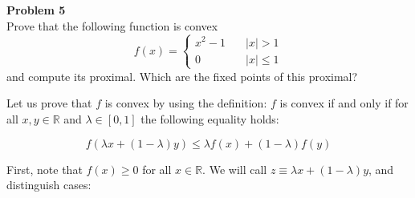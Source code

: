 \documentclass[11pt,table]{article}
\newcommand{\R}{\mathbb{R}}
\newenvironment{problem}[2][Problem]
{ \begin{mdframed}[backgroundcolor=gray!20] \textbf{#1 #2} \\ }
	{  \end{mdframed} }
\begin{document}
	\begin{problem}{5}
		Prove that the following function is convex
		\[
		f(x) =
		\begin{cases}
			x^{2}-1 \quad & |x|>1 \\
			0  \quad & |x| \leq 1
		\end{cases}
		\]
		and compute its proximal. Which are the fixed points of this proximal?
	\end{problem}
	
	Let us prove that $f$ is convex by using the definition: $f$ is convex if and only if for all $x,y \in \R$ and $\lambda \in [0,1]$ the following equality holds:
	
	\begin{equation}
		\label{eq5-1}
		f(\lambda x + (1 - \lambda)y) \leq \lambda f(x) + (1 - \lambda) f(y)
	\end{equation}
	
	First, note that $f(x) \ge 0$ for all $x \in \R$. We will call $z \equiv \lambda x + (1 - \lambda) y$, and distinguish cases:
	
\end{document}
